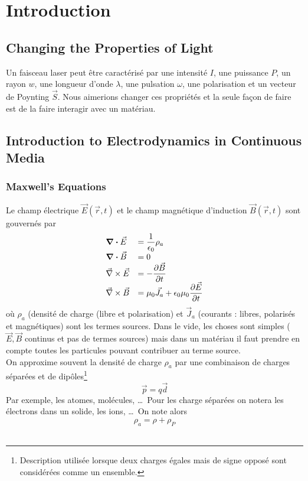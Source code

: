 \chapter{Introduction}
\section{Changing the Properties of Light}
Un faisceau laser peut être caractérisé par une intensité $I$, une puissance $P$, un rayon $w$, 
une longueur d'onde $\lambda$, une pulsation $\omega$, une polarisation et un vecteur de Poynting 
$\vec{S}$. Nous aimerions changer ces propriétés et la seule façon de faire est de la faire interagir 
avec un matériau.

\section{Introduction to Electrodynamics in Continuous Media}
\subsection{Maxwell's Equations}
Le champ électrique $\vec{E}(\vec r,t)$ et le champ magnétique d'induction $\vec B(\vec r,t)$ 
sont gouvernés par 
\begin{equation}
\begin{array}{ll}
\div \vec E &=\displaystyle \frac{1}{\epsilon_0}\rho_a\\
\div \vec B &= 0\\
\vec\nabla\times\vec E&=\displaystyle -\frac{\partial \vec{B}}{\partial t}\\
\vec\nabla\times\vec B&=\displaystyle \mu_0\vec{J_a} + \epsilon_0\mu_0\frac{\partial \vec{E}}{\partial t}
\end{array}
\end{equation}
où $\rho_a$ (densité de charge (libre et polarisation) et $\vec{J}_a$ (courants : libres, polarisés 
et magnétiques) sont les termes sources. Dans le vide, les choses sont simples ($\vec E, \vec B$ 
continus et pas de termes sources) mais dans un matériau il faut prendre en compte toutes les 
particules pouvant contribuer au terme source. \\

On approxime souvent la densité de charge $\rho_a$ par une combinaison de charges séparées et de 
dipôles\footnote{Description utilisée lorsque deux charges égales mais de signe opposé sont 
considérées comme un ensemble.}
\begin{equation}
\vec p = q\vec d
\end{equation}
Par exemple, les atomes, molécules, \dots\ Pour les charge séparées on notera les électrons dans
un solide, les ions, \dots\ On note alors
\begin{equation}
\rho_a = \rho + \rho_P
\end{equation}\ \\

